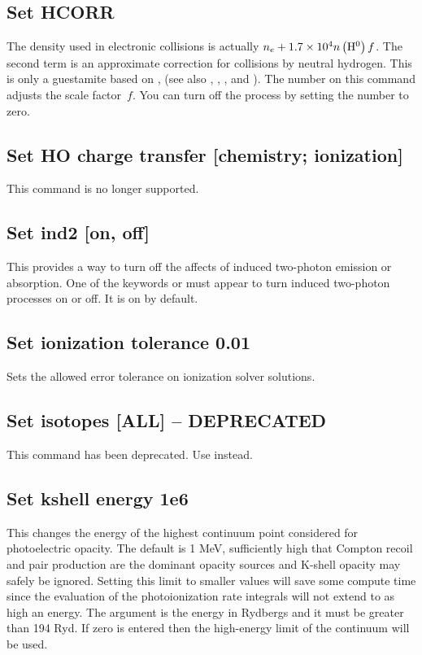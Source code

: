 \subsection{Set HCORR}

The density used in electronic collisions is actually $n_e  + 1.7 \times
10^{4} n\left( {\mbox{{\rm H}$^0$} } \right)f$.
The second term is an approximate correction for collisions by neutral
hydrogen.
This is only a guestamite based on \citet{Drawin1969},
(see also \citealp{Weisheit1974},
\citealp{Steenbock1984}, \citealp{Lambert1993}, and \citealp{Kiselman2000}).
The
number on this command adjusts the scale factor~$f$.
You can turn off the
process by setting the number to zero.

\subsection{Set HO charge transfer [chemistry; ionization]}

This command is no longer supported.

\subsection{Set ind2 [on, off]}

This provides a way to turn off the affects of induced two-photon emission
or absorption.
One of the keywords  or  must appear
to turn induced
two-photon processes on or off.
It is on by default.

\subsection{Set ionization tolerance 0.01}

Sets the allowed error tolerance on ionization solver solutions.

\subsection{Set isotopes [ALL] -- DEPRECATED}

This command has been deprecated.
Use  instead.

\subsection{Set kshell energy 1e6}

This changes the energy of the highest continuum point considered for
photoelectric opacity.
The default is 1 MeV, sufficiently high that Compton
recoil and pair production are the dominant opacity sources and K-shell
opacity may safely be ignored.
Setting this limit to smaller values will
save some compute time since the evaluation of the photoionization rate
integrals will not extend to as high an energy.
The argument is the energy
in Rydbergs and it must be greater than 194 Ryd.
If zero is entered then
the high-energy limit of the continuum will be used.

